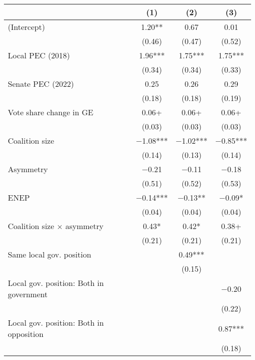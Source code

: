 \begin{tabular}[t]{lccc}
\toprule
& (1) & (2) & (3) \\ 
\midrule 
(Intercept)                             & \num{1.20}**   & \num{0.67}     & \num{0.01}     \\
& (\num{0.46})   & (\num{0.47})   & (\num{0.52})   \\
Local PEC (2018)                        & \num{1.96}***  & \num{1.75}***  & \num{1.75}***  \\
& (\num{0.34})   & (\num{0.34})   & (\num{0.33})   \\
Senate PEC (2022)                       & \num{0.25}     & \num{0.26}     & \num{0.29}     \\
& (\num{0.18})   & (\num{0.18})   & (\num{0.19})   \\
Vote share change in GE                 & \num{0.06}+    & \num{0.06}+    & \num{0.06}+    \\
& (\num{0.03})   & (\num{0.03})   & (\num{0.03})   \\
Coalition size                          & \num{-1.08}*** & \num{-1.02}*** & \num{-0.85}*** \\
& (\num{0.14})   & (\num{0.13})   & (\num{0.14})   \\
Asymmetry                               & \num{-0.21}    & \num{-0.11}    & \num{-0.18}    \\
& (\num{0.51})   & (\num{0.52})   & (\num{0.53})   \\
ENEP                                    & \num{-0.14}*** & \num{-0.13}**  & \num{-0.09}*   \\
& (\num{0.04})   & (\num{0.04})   & (\num{0.04})   \\
Coalition size × asymmetry              & \num{0.43}*    & \num{0.42}*    & \num{0.38}+    \\
& (\num{0.21})   & (\num{0.21})   & (\num{0.21})   \\
Same local gov. position                &                 & \num{0.49}***  &                 \\
&                 & (\num{0.15})   &                 \\
Local gov. position: Both in government &                 &                 & \num{-0.20}    \\
&                 &                 & (\num{0.22})   \\
Local gov. position: Both in opposition &                 &                 & \num{0.87}***  \\
&                 &                 & (\num{0.18})   \\

\end{tabular}
